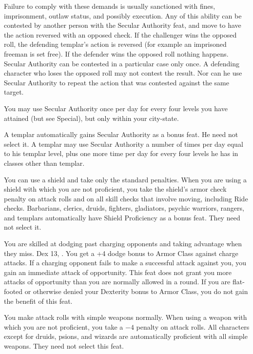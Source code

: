 {Failure to comply with these demands is usually sanctioned with fines, imprisonment, outlaw status, and possibly execution. Any of this ability can be contested by another person with the Secular Authority feat, and move to have the action reversed with an opposed  check. If the challenger wins the opposed roll, the defending templar's action is reversed (for example an imprisoned freeman is set free). If the defender wins the opposed roll nothing happens. Secular Authority can be contested in a particular case only once. A defending character who loses the opposed roll may not contest the result. Nor can he use Secular Authority to repeat the action that was contested against the same target.

You may use Secular Authority once per day for every four levels you have attained (but see Special), but only
within your city-state.}
{}
{A templar automatically gains Secular Authority as a bonus feat. He need not select it. A templar may use Secular Authority a number of times per day equal to his templar level, plus one more time per day for every four levels he has in classes other than templar.}

{}{}
{You can use a shield and take only the standard penalties.}
{When you are using a shield with which you are not proficient, you take the shield's armor check penalty on attack rolls and on all skill checks that involve moving, including Ride checks.}
{Barbarians, clerics, druids, fighters, gladiators, psychic warriors, rangers, and templars automatically have Shield Proficiency as a bonus feat. They need not select it.}

{You are skilled at dodging past charging opponents and taking advantage when they miss.}
{Dex 13, .}
{You get a +4 dodge bonus to Armor Class against charge attacks. If a charging opponent fails to make a successful attack against you, you gain an immediate attack of opportunity. This feat does not grant you more attacks of opportunity than you are normally allowed in a round. If you are flat-footed or otherwise denied your Dexterity bonus to Armor Class, you do not gain the benefit of this feat.}{}{}

{}{}
{You make attack rolls with simple weapons normally.}
{When using a weapon with which you are not proficient, you take a $-4$ penalty on attack rolls.}
{All characters except for druids, psions, and wizards are automatically proficient with all simple weapons. They need not select this feat.}

